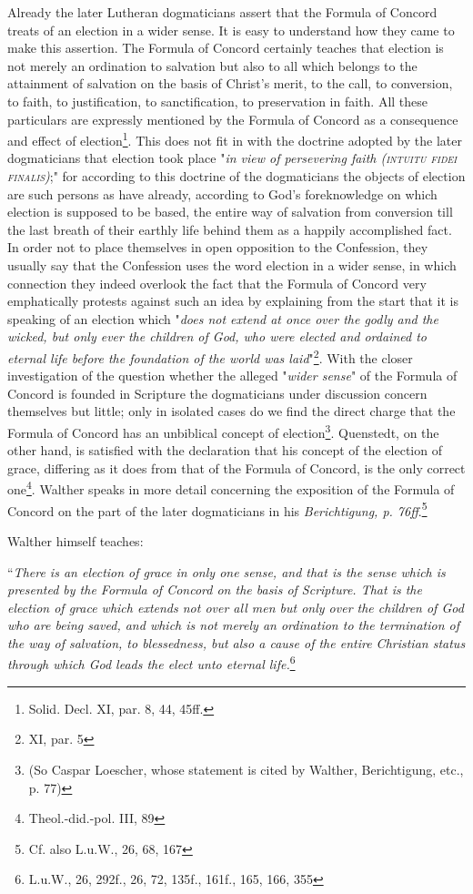 Already the later Lutheran dogmaticians assert that the Formula of Concord treats of an election in a wider sense. It is easy to understand how they came to make this assertion. The Formula of Concord certainly teaches that election is not merely an ordination to salvation but also to all which belongs to the attainment of salvation on the basis of Christ's merit, to the call, to conversion, to faith, to justification, to sanctification, to preservation in faith. All these particulars are expressly mentioned by the Formula of Concord as a consequence and effect of election\footnote{Solid. Decl. XI, par. 8, 44, 45ff.}.  This does not fit in with the doctrine adopted by the later dogmaticians that election took place "\textit{in view of persevering faith {\scriptsize\textsc{(intuitu fidei finalis)}}};" for according to this doctrine of the dogmaticians the objects of election are such persons as have already, according to God's foreknowledge on which election is supposed to be based, the entire way of salvation from conversion till the last breath of their earthly life behind them as a happily accomplished fact. In order not to place themselves in open opposition to the Confession, they usually say that the Confession uses the word election in a wider sense, in which connection they indeed overlook the fact that the Formula of Concord very emphatically protests against such an idea by explaining from the start that it is speaking of an election which "\textit{does not extend at once over the godly and the wicked, but only ever the children of God, who were elected and ordained to eternal life before the foundation of the world was laid}"\footnote{XI, par. 5}. With the closer investigation of the question whether the alleged "\textit{wider sense}" of the Formula of Concord is founded in Scripture the dogmaticians under discussion concern themselves but little; only in isolated cases do we find the direct charge that the Formula of Concord has an unbiblical concept of election\footnote{(So Caspar Loescher, whose statement is cited by Walther, Berichtigung, etc., p. 77)}. Quenstedt, on the other hand, is satisfied with the declaration that his concept of the election of grace, differing as it does from that of the Formula of Concord, is the only correct one\footnote{Theol.-did.-pol. III, 89}. Walther speaks in more detail concerning the exposition of the Formula of Concord on the part of the later dogmaticians in his \textit{Berichtigung, p. 76ff}.\footnote{Cf. also L.u.W., 26, 68, 167}

Walther himself teaches: \begin{displayquote}``\textit{There is an election of grace in only one sense, and that is the sense which is presented by the Formula of Concord on the basis of Scripture. That is the election of grace which extends not over all men but only over the children of God who are being saved, and which is not merely an ordination to the termination of the way of salvation, to blessedness, but also a cause of the entire Christian status through which God leads the elect unto eternal life.}\footnote{L.u.W., 26, 292f., 26, 72, 135f., 161f., 165, 166, 355}\end{displayquote}

